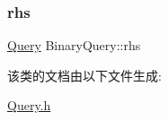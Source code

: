 \mbox{\label{classBinaryQuery_a22e8a3a081421a2ea2106aa5b0541773}} 
\subsubsection{\texorpdfstring{rhs}{rhs}}
{\footnotesize\ttfamily \hyperlink{classQuery}{Query} Binary\+Query\+::rhs\hspace{0.3cm}{\ttfamily [protected]}}



该类的文档由以下文件生成\+:\begin{DoxyCompactItemize}
\item 
\hyperlink{Query_8h}{Query.\+h}\end{DoxyCompactItemize}
